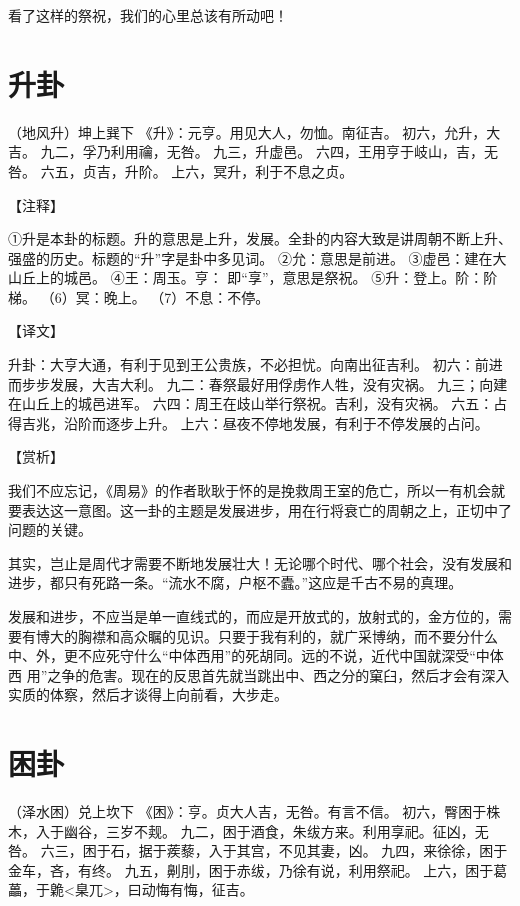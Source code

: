 \documentclass[12pt,UTF8]{ctexbook}
\begin{document}
看了这样的祭祝，我们的心里总该有所动吧！

\chapter{升卦}

（地风升）坤上巽下
《升》：元亨。用见大人，勿恤。南征吉。
初六，允升，大吉。
九二，孚乃利用禴，无咎。
九三，升虚邑。
六四，王用亨于岐山，吉，无咎。
六五，贞吉，升阶。
上六，冥升，利于不息之贞。

【注释】

①升是本卦的标题。升的意思是上升，发展。全卦的内容大致是讲周朝不断上升、强盛的历史。标题的“升”字是卦中多见词。
②允：意思是前进。
③虚邑：建在大山丘上的城邑。
④王：周玉。亨： 即“享”，意思是祭祝。
⑤升：登上。阶：阶梯。
（6）冥：晚上。
（7）不息：不停。

【译文】

升卦：大亨大通，有利于见到王公贵族，不必担忧。向南出征吉利。
初六：前进而步步发展，大吉大利。
九二：春祭最好用俘虏作人牲，没有灾祸。
九三；向建在山丘上的城邑进军。
六四：周王在歧山举行祭祝。吉利，没有灾祸。
六五：占得吉兆，沿阶而逐步上升。
上六：昼夜不停地发展，有利于不停发展的占问。

【赏析】

我们不应忘记，《周易》的作者耿耿于怀的是挽救周王室的危亡，所以一有机会就要表达这一意图。这一卦的主题是发展进步，用在行将衰亡的周朝之上，正切中了问题的关键。

其实，岂止是周代才需要不断地发展壮大！无论哪个时代、哪个社会，没有发展和进步，都只有死路一条。“流水不腐，户枢不蠹。”这应是千古不易的真理。

发展和进步，不应当是单一直线式的，而应是开放式的，放射式的，金方位的，需要有博大的胸襟和高众瞩的见识。只要于我有利的，就广采博纳，而不要分什么中、外，更不应死守什么“中体西用”的死胡同。远的不说，近代中国就深受“中体西 用”之争的危害。现在的反思首先就当跳出中、西之分的窠臼，然后才会有深入实质的体察，然后才谈得上向前看，大步走。

\chapter{困卦}

（泽水困）兑上坎下
《困》：亨。贞大人吉，无咎。有言不信。
初六，臀困于株木，入于幽谷，三岁不觌。
九二，困于酒食，朱绂方来。利用享祀。征凶，无咎。
六三，困于石，据于蒺藜，入于其宫，不见其妻，凶。
九四，来徐徐，困于金车，吝，有终。
九五，劓刖，困于赤绂，乃徐有说，利用祭祀。
上六，困于葛藟，于臲<臬兀>，曰动悔有悔，征吉。
\end{document}
